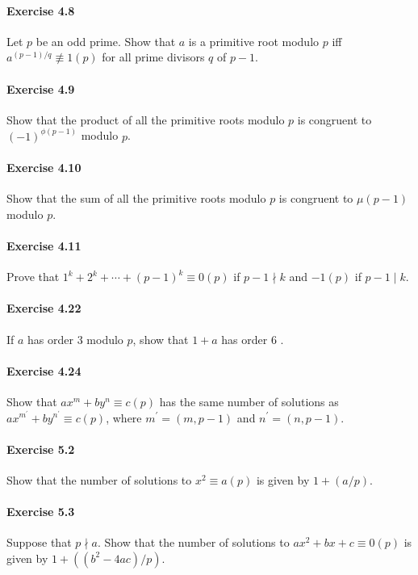 \documentclass{article}
\begin{document}
\paragraph{Exercise 4.8} Let $p$ be an odd prime. Show that $a$ is a primitive root modulo $p$ iff $a^{(p-1) / q} \not \equiv 1(p)$ for all prime divisors $q$ of $p-1$.

\paragraph{Exercise 4.9} Show that the product of all the primitive roots modulo $p$ is congruent to $(-1)^{\phi(p-1)}$ modulo $p$.

\paragraph{Exercise 4.10} Show that the sum of all the primitive roots modulo $p$ is congruent to $\mu(p-1)$ modulo $p$.

\paragraph{Exercise 4.11} Prove that $1^{k}+2^{k}+\cdots+(p-1)^{k} \equiv 0(p)$ if $p-1 \nmid k$ and $-1(p)$ if $p-1 \mid k$.

\paragraph{Exercise 4.22} If $a$ has order 3 modulo $p$, show that $1+a$ has order 6 .

\paragraph{Exercise 4.24} Show that $a x^{m}+b y^{n} \equiv c(p)$ has the same number of solutions as $a x^{m^{\prime}}+b y^{n^{\prime}} \equiv c(p)$, where $m^{\prime}=(m, p-1)$ and $n^{\prime}=(n, p-1)$.

\paragraph{Exercise 5.2} Show that the number of solutions to $x^{2} \equiv a(p)$ is given by $1+(a / p)$.

\paragraph{Exercise 5.3} Suppose that $p \nmid a$. Show that the number of solutions to $a x^{2}+b x+c \equiv 0(p)$ is given by $1+\left(\left(b^{2}-4 a c\right) / p\right)$.
\end{document}
